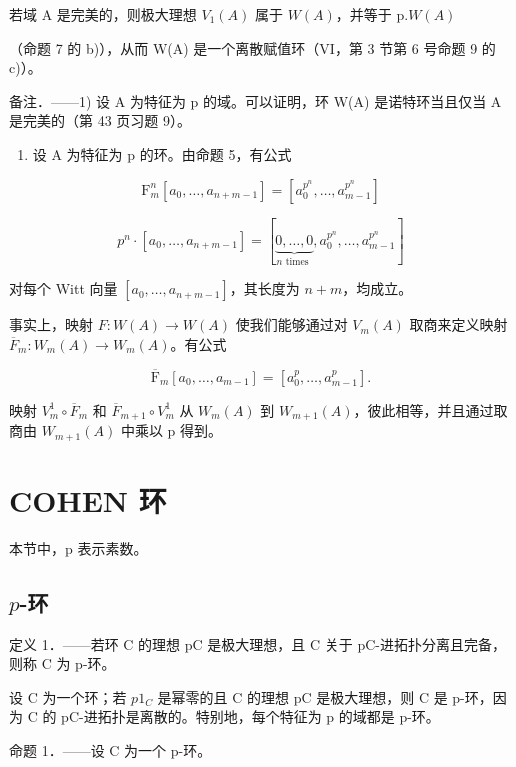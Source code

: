 若域 A 是完美的，则极大理想 \(V_{1}(A)\) 属于 \(W(A)\)，并等于 p.\(W(A)\)

（命题 7 的 b)），从而 W(A) 是一个离散赋值环（VI，第 3 节第 6 号命题 9 的 c)）。

备注．——1) 设 A 为特征为 p 的域。可以证明，环 W(A) 是诺特环当且仅当 A 是完美的（第 43 页习题 9）。

\begin{enumerate}
\def\labelenumi{\arabic{enumi})}
\setcounter{enumi}{1}
\tightlist
\item
  设 A 为特征为 p 的环。由命题 5，有公式
\end{enumerate}

\[
\mathrm{F} _ {m} ^ {n} [ a _ {0}, \dots , a _ {n + m - 1} ] = [ a _ {0} ^ {p ^ {n}}, \dots , a _ {m - 1} ^ {p ^ {n}} ]
\]

\[
p ^ {n} \cdot [ a _ {0}, \dots , a _ {n + m - 1} ] = [ \underbrace {0 , \dots , 0} _ {n \text {   times }}, a _ {0} ^ {p ^ {n}}, \dots , a _ {m - 1} ^ {p ^ {n}} ]
\]

对每个 Witt 向量 \([a_0, \dots, a_{n+m-1}]\)，其长度为 \(n + m\)，均成立。

事实上，映射 \(F:W(A)\to W(A)\) 使我们能够通过对 \(V_{m}(A)\) 取商来定义映射 \(\overline{F}_{m}:W_{m}(A)\to W_{m}(A)\)。有公式

\[
\overline {{{{\mathrm{F}}}}} _ {m} \left[ a _ {0}, \dots , a _ {m - 1} \right] = \left[ a _ {0} ^ {p}, \dots , a _ {m - 1} ^ {p} \right].
\]

映射 \(V_{m}^{1} \circ \overline{F}_{m}\) 和 \(\overline{F}_{m+1} \circ V_{m}^{1}\) 从 \(W_{m}(A)\) 到 \(W_{m+1}(A)\)，彼此相等，并且通过取商由 \(W_{m+1}(A)\) 中乘以 p 得到。

\section{COHEN 环}

本节中，p 表示素数。

\subsection{\texorpdfstring{\(p\)-环}{p-环}}

定义 1．——若环 C 的理想 pC 是极大理想，且 C 关于 pC-进拓扑分离且完备，则称 C 为 p-环。

设 C 为一个环；若 \(p1_{C}\) 是幂零的且 C 的理想 pC 是极大理想，则 C 是 p-环，因为 C 的 pC-进拓扑是离散的。特别地，每个特征为 p 的域都是 p-环。

命题 1．——设 C 为一个 p-环。

